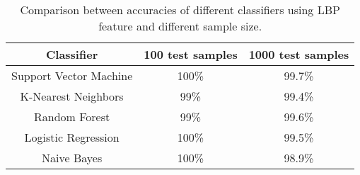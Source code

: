 \begin{table}[h!]
\centering
\begin{tabular}{||c | c | c||}
 \hline
 Classifier & 100 test samples & 1000 test samples \\ [0.5ex] 
 \hline\hline
 Support Vector Machine & 100\% & 99.7\% \\ 
 \hline
 K-Nearest Neighbors & 99\% & 99.4\% \\
 \hline
 Random Forest & 99\% & 99.6\% \\
 \hline
 Logistic Regression & 100\% & 99.5\% \\
 \hline
 Naive Bayes & 100\% & 98.9\% \\ [1ex] 
 \hline
\end{tabular}
\caption{Comparison between accuracies of different classifiers using LBP feature and different sample size.}
\label{table:1}
\end{table}